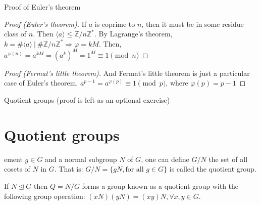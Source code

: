 \documentclass{beamer}
\begin{document}
\begin{frame}{Proof of Euler's theorem}
	\begin{proof}[Proof (Euler's theorem)]
		If $a$ is coprime to $n$, then it must be in some residue class of $n$. Then 
		$\langle a \rangle \le \mathbb{Z} / n \mathbb{Z}^*$. \newline
		By Lagrange's theorem, $k = \#\langle a \rangle \ | \ \#\mathbb{Z} / n \mathbb{Z}^* \Rightarrow \varphi = kM$. 
		\newline
		Then, $a^{\varphi(n)} = a^{kM} = (a^{k})^M = 1^M \equiv 1 \pmod n$ 
	\end{proof}
	\begin{proof}[Proof (Fermat's little theorem)]
		And Fermat's little theorem is just a particular case of Euler's theorem. \newline
		$a ^ {p - 1} = a ^ {\varphi(p)} \equiv 1 \pmod p$, where $\varphi(p) = p - 1$ 
	\end{proof}
\end{frame}

\begin{frame}{Quotient groups (proof is left as an optional exercise)}
	\section{Quotient groups}
	\begin{definition}ement $g \in G$ and a normal subgroup $N$ of $G$, one can define $G / N$ the set of 
		all cosets of $N$ in $G$. That is: $G / N = \{ gN, \text{for all } g \in G\}$ is called the quotient group.
	\end{definition}

	\begin{theorem}
		If $N \unlhd G$ then $Q = N/G$ forms a group known as a quotient group with the following group operation: 
		\newline
		$(xN)(yN) = (xy)N, \forall x, y \in G$.
	\end{theorem}
\end{frame}
\end{document}
